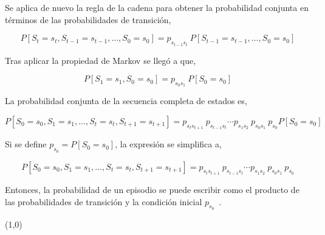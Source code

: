 Se aplica de nuevo la regla de la cadena para obtener la probabilidad conjunta en términos de las probabilidades de transición,

\[
    P[S_t = s_t, S_{t-1} = s_{t-1}, \dots, S_0 = s_0] = p_{s_{t-1} s_{t}} \ P[S_{t-1} = s_{t-1}, \ldots, S_0 = s_0]
\]

Tras aplicar la propiedad de Markov se llegó a que,

\[
    P[S_1 = s_1, S_0 = s_0] = p_{s_0 s_1} \ P[S_0 = s_0]
\]

La probabilidad conjunta de la secuencia completa de estados es,

\[
    P[S_0 = s_0, S_1 = s_1, \ldots, S_t = s_t, S_{t+1} = s_{t+1}] = p_{s_t s_{t+1}} \ p_{s_{t-1} s_t} \cdots p_{s_1 s_2} \ p_{s_0 s_1} \ p_{s_0} P[S_0 = s_0]
\]

Si se define \( p_{s_0} = P[S_0 = s_0] \), la expresión se simplifica a,

\[
    P[S_0 = s_0, S_1 = s_1, \ldots, S_t = s_t, S_{t+1} = s_{t+1}] = p_{s_t s_{t+1}} \ p_{s_{t-1} s_t} \cdots p_{s_1 s_2} \ p_{s_0 s_1} \ p_{s_0}
\]

Entonces, la probabilidad de un episodio se puede escribir como el producto de las probabilidades de transición y la condición inicial $p_{s_0}$~\cite{Sutton2018}.

\line(1,0){\textwidth}
